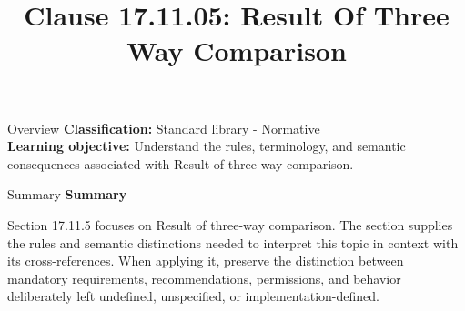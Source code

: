 \documentclass[10pt,letterpaper]{article}
\title{Clause 17.11.05: Result Of Three Way Comparison}
\author{}
\date{}
\begin{document}
\maketitle
\begin{CornellOverviewBox}{Overview}
\textbf{Classification:} Standard library - Normative\\[2pt]
\textbf{Learning objective:} Understand the rules, terminology, and semantic consequences associated with Result of three-way comparison.
\end{CornellOverviewBox}\begin{CornellSummaryBox}{Summary}
{\sffamily\bfseries\color{Accent} Summary}\par\vspace{3pt}Section 17.11.5 focuses on Result of three-way comparison. The section supplies the rules and semantic distinctions needed to interpret this topic in context with its cross-references. When applying it, preserve the distinction between mandatory requirements, recommendations, permissions, and behavior deliberately left undefined, unspecified, or implementation-defined.
\end{CornellSummaryBox}
\end{document}
